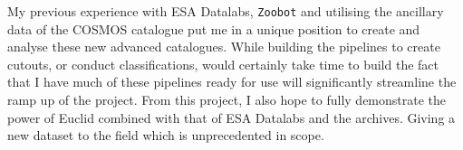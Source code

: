 \documentclass[11pt]{article}
\begin{document}
My previous experience with ESA Datalabs, \texttt{Zoobot} and utilising the ancillary data of the COSMOS catalogue put me in a unique position to create and analyse these new advanced catalogues. While building the pipelines to create cutouts, or conduct classifications, would certainly take time to build the fact that I have much of these pipelines ready for use will significantly streamline the ramp up of the project. From this project, I also hope to fully demonstrate the power of Euclid combined with that of ESA Datalabs and the archives. Giving a new dataset to the field which is unprecedented in scope.

\begin{multicols}{2}






\end{multicols}

\end{document}
